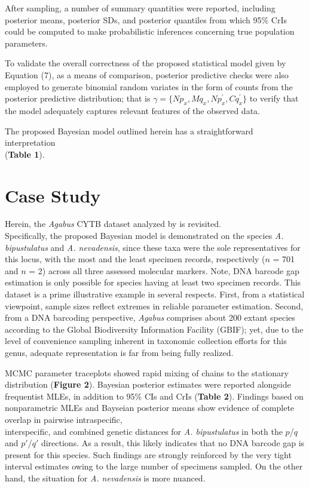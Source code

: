 \documentclass[12pt]{article}
\begin{document}
After sampling, a number of summary quantities were reported, including posterior means, posterior SDs, and posterior quantiles from which 95\% CrIs could be computed to make probabilistic inferences concerning true population parameters.

To validate the overall correctness of the proposed statistical model given by Equation (7), as a means of comparison, posterior predictive checks were also employed to generate binomial random variates in the form of counts from the posterior predictive distribution; that is $\gamma = \{Np_x, Mq_x, Np^{'}_x, Cq^{'}_x\}$ to verify that the model adequately captures relevant features of the observed data. 

The proposed Bayesian model outlined herein has a straightforward interpretation \\ (\textbf{Table 1}). 

\section{Case Study}

Herein, the \textit{Agabus} CYTB dataset analyzed by \citet{phillips2024measure} is revisited. \\ Specifically, the proposed Bayesian model is demonstrated on the species \textit{A. bipustulatus} and \textit{A. nevadensis}, since these taxa were the sole representatives for this locus, with the most and the least specimen records, respectively ($n$ = 701 and $n$ = 2) across all three assessed molecular markers. Note, DNA barcode gap estimation is only possible for species having at least two specimen records. This dataset is a prime illustrative example in several respects. First, from a statistical viewpoint, sample sizes reflect extremes in reliable parameter estimation. Second, from a DNA barcoding perspective, \textit{Agabus} comprises about 200 extant species according to the Global Biodiversity Information Facility (GBIF); yet, due to the level of convenience sampling inherent in taxonomic collection efforts for this genus, adequate representation is far from being fully realized. 

MCMC parameter traceplots showed rapid mixing of chains to the stationary distribution (\textbf{Figure 2}).  Bayesian posterior estimates were reported alongside frequentist MLEs, in addition to 95\% CIs and CrIs (\textbf{Table 2}). Findings based on nonparametric MLEs and Bayseian posterior means show evidence of complete overlap in pairwise intraspecific, \\ interspecific, and combined genetic distances for \textit{A. bipustulatus} in both the $p$/$q$ and $p'$/$q'$ directions. As a result, this likely indicates that no DNA barcode gap is present for this species. Such findings are strongly reinforced by the very tight interval estimates owing to the large number of specimens sampled. On the other hand, the situation for \textit{A. nevadensis} is more nuanced.
\end{document}
